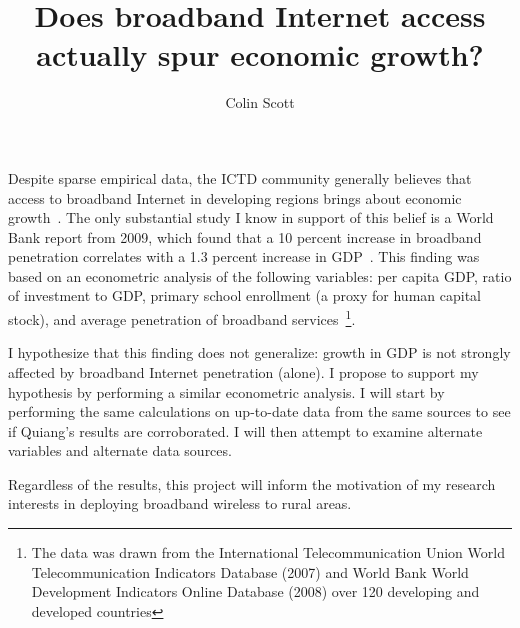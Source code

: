 \documentclass[10pt]{article}
\title{Does broadband Internet access actually spur economic growth?}
\author{Colin Scott}
\begin{document}
\maketitle

Despite sparse empirical data, the ICTD community generally believes that access
to broadband Internet in developing regions brings about economic growth~\cite{brewer2005case}.
The only substantial study I know in support of this belief is a World Bank report
from 2009, which found that a 10 percent increase in broadband penetration
correlates with a 1.3 percent increase in GDP~\cite{qiang2009economic}. This
finding was based on an econometric analysis of the following
variables: per capita GDP, ratio of
investment to GDP, primary school enrollment (a proxy for human capital stock),
and average penetration of broadband services~\footnote{The data was drawn
from the International Telecommunication Union World
Telecommunication Indicators Database (2007) and World Bank World Development Indicators Online
Database (2008) over 120 developing
and developed countries}.

I hypothesize that this finding does not generalize: growth in GDP is not
strongly affected by broadband Internet penetration (alone). I propose to
support my hypothesis by performing a similar econometric analysis. I will
start by performing the same calculations on up-to-date data from the same
sources to see if
Quiang's results are corroborated. I will then attempt to examine alternate
variables and alternate data sources.

Regardless of the results, this project
will inform the motivation of my research interests in deploying broadband
wireless to rural areas.




\end{document}
